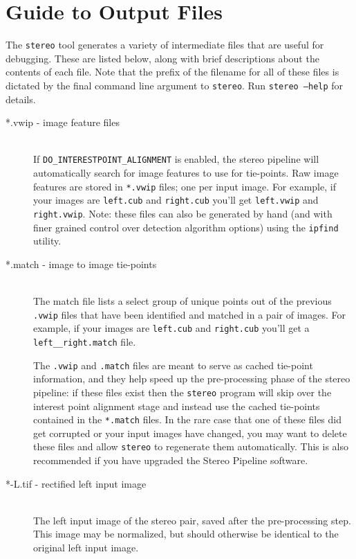 \chapter{Guide to Output Files}
\label{chapter:outputfiles}

The {\tt stereo} tool generates a variety of intermediate files that
are useful for debugging.  These are listed below, along with brief
descriptions about the contents of each file.  Note that the prefix of
the filename for all of these files is dictated by the final command
line argument to {\tt stereo}.  Run {\tt stereo --help} for details.

\begin{description}

\item[*.vwip \textnormal{- image feature files}] \hfill \\ 
  If \texttt{DO\_INTERESTPOINT\_ALIGNMENT} is enabled, the stereo pipeline will
  automatically search for image features to use for tie-points.  Raw
  image features are stored in \texttt{*.vwip} files; one per input image. For
  example, if your images are \texttt{left.cub} and \texttt{right.cub}
  you'll get \texttt{left.vwip} and \texttt{right.vwip}.  Note: these
  files can also be generated by hand (and with finer grained control
  over detection algorithm options) using the {\tt ipfind} utility.

\item[*.match \textnormal{- image to image tie-points}] \hfill \\ 
  The match file lists a select group of unique points out of the
  previous \texttt{.vwip} files that have been identified and matched
  in a pair of images.  For example, if your images are
  \texttt{left.cub} and \texttt{right.cub} you'll get a
  \texttt{left\_\_right.match} file.  

  The \texttt{.vwip} and \texttt{.match} files are meant to serve
  as cached tie-point information, and they help speed up the
  pre-processing phase of the stereo pipeline: if these files exist
  then the \texttt{stereo} program will skip over the interest point
  alignment stage and instead use the cached tie-points contained
  in the \texttt{*.match} files.  In the rare case that one of these files
  did get corrupted or your input images have changed, you may want
  to delete these files and allow {\tt stereo} to regenerate them
  automatically.  This is also recommended if you have upgraded the
  Stereo Pipeline software.

\item[*-L.tif - \textnormal{rectified left input image}] \hfill \\ 
  The left input image of the stereo pair, saved after the
  pre-processing step.  This image may be normalized, but should
  otherwise be identical to the original left input image.


\end{description}
